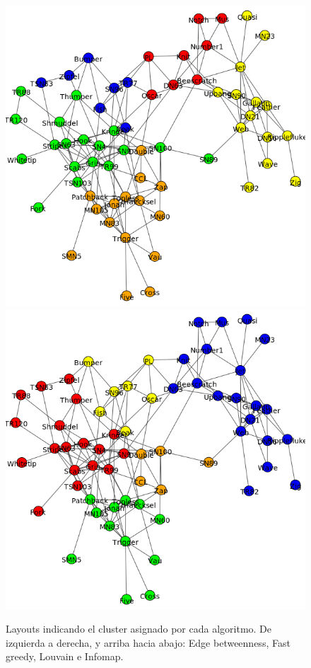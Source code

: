 \begin{figure}
\includegraphics[scale = 0.22]{graph_Louvain}
\includegraphics[scale = 0.22]{graph_Infomap}
\caption{Layouts indicando el cluster asignado por cada algoritmo. De izquierda a derecha, y arriba hacia abajo: Edge betweenness, Fast greedy, Louvain e Infomap.}
\label{fig:Layouts_clusters}
\end{figure}

